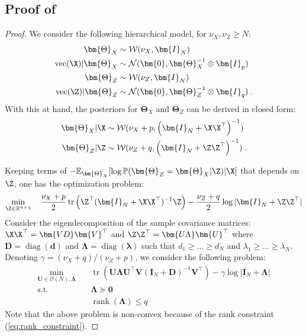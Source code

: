 \subsection{Proof of }

\PCAgraphcoupling*

\begin{proof}
We consider the following hierarchical model, for $\nu_{X}, \nu_{Z} \geq N$:
\begin{align*}
    \bm{\Theta}_{X} &\sim  \mathcal{W}(\nu_{X}, \bm{I}_N) \\
    \mathrm{vec}(\X) | \bm{\Theta}_{X} &\sim \mathcal{N}(\bm{0}, \bm{\Theta}_{X}^{-1} \otimes \bm{I}_p) \\
    \bm{\Theta}_{Z} &\sim  \mathcal{W}(\nu_{Z}, \bm{I}_N) \\
    \mathrm{vec}(\Z) | \bm{\Theta}_{Z} &\sim \mathcal{N}(\bm{0}, \bm{\Theta}_{Z}^{-1} \otimes \bm{I}_q) \:.
\end{align*}
With this at hand, the posteriors for $\bm{\Theta}_X$ and $\bm{\Theta}_Z$ can be derived in closed form: 
\begin{align*}
    \bm{\Theta}_{X} | \X &\sim  \mathcal{W}(\nu_{X}+p, \left(\bm{I}_N + \X \X^\top\right)^{-1}) \\
    \bm{\Theta}_{Z} | \Z &\sim  \mathcal{W}(\nu_{Z} + q, \left(\bm{I}_N + \Z \Z^\top\right)^{-1}) \:.
\end{align*}

Keeping terms of $-\mathbb{E}_{\bm{\Theta}_{X}}[\log \mathbb{P}(\bm{\Theta}_{Z} = \bm{\Theta}_{X}| \Z )| \X]$ that depends on $\Z$, one has the optimization problem:
\begin{align*}
    \min_{\Z \in \mathbb{R}^{n \times q}} \quad \frac{\nu_{X}+p}{2}\operatorname{tr}\left(\Z^\top(\bm{I}_N +  \X\X^\top)^{-1}\Z\right) - \frac{\nu_{Z}+q}{2}\log |\bm{I}_N +  \Z\Z^\top|
\end{align*}
Consider the eigendecomposition of the sample covariance matrices: $\X\X^\top = \bm{V D} \bm{V}^\top$ and $\Z\Z^\top = \bm{U \Lambda} \bm{U}^\top$ where $\bm{D}=\operatorname{diag}(\bm{d})$ and $\bm{\Lambda}=\operatorname{diag}(\bm{\lambda})$ such that $d_1 \geq ... \geq d_N$ and $\lambda_1 \geq ... \geq \lambda_N$. Denoting $\gamma = (\nu_{X}+q)/(\nu_{Z}+p)$, we consider the following problem:
\begin{align}
   \min_{\bm{U} \in \mathcal{O}(N), \bm{\Lambda}} \quad & \operatorname{tr}\left(\bm{U} \bm{\Lambda} \bm{U}^\top \bm{V} (\bm{I}_N + \bm{D})^{-1} \bm{V}^\top\right) - \gamma \log |\bm{I}_N + \bm{\Lambda}| \label{eq:optim_eigenvalues_eigenvectors} \\
    \textrm{s.t.} \quad & \bm{\Lambda} \succcurlyeq \bm{0} \label{eq:positive_definite_constraint}\\
    & \operatorname{rank}(\bm{\Lambda}) \leq q \label{eq:rank_constraint}
\end{align}
Note that the above problem is non-convex because of the rank constraint (\ref{eq:rank_constraint}). 


\end{proof}
